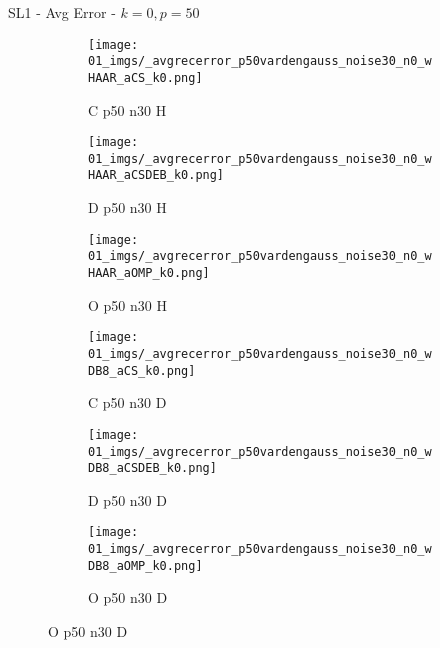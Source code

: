 \begin{frame}{SL1 - Avg Error - $k=0,p=50$}{}
\begin{figure}
\vspace{5pt}

\begin{subfigure}{0.13\textwidth}
\texttt{[image: 01\_imgs/\_avgrecerror\_p50vardengauss\_noise30\_n0\_wHAAR\_aCS\_k0.png]}
\caption*{\tiny C p50 n30 H}
\end{subfigure}
\begin{subfigure}{0.13\textwidth}
\texttt{[image: 01\_imgs/\_avgrecerror\_p50vardengauss\_noise30\_n0\_wHAAR\_aCSDEB\_k0.png]}
\caption*{\tiny D p50 n30 H}
\end{subfigure}
\begin{subfigure}{0.13\textwidth}
\texttt{[image: 01\_imgs/\_avgrecerror\_p50vardengauss\_noise30\_n0\_wHAAR\_aOMP\_k0.png]}
\caption*{\tiny O p50 n30 H}
\end{subfigure}
\begin{subfigure}{0.13\textwidth}
\texttt{[image: 01\_imgs/\_avgrecerror\_p50vardengauss\_noise30\_n0\_wDB8\_aCS\_k0.png]}
\caption*{\tiny C p50 n30 D}
\end{subfigure}
\begin{subfigure}{0.13\textwidth}
\texttt{[image: 01\_imgs/\_avgrecerror\_p50vardengauss\_noise30\_n0\_wDB8\_aCSDEB\_k0.png]}
\caption*{\tiny D p50 n30 D}
\end{subfigure}
\begin{subfigure}{0.13\textwidth}
\texttt{[image: 01\_imgs/\_avgrecerror\_p50vardengauss\_noise30\_n0\_wDB8\_aOMP\_k0.png]}
\caption*{\tiny O p50 n30 D}
\end{subfigure}
\end{figure}
\end{frame}


